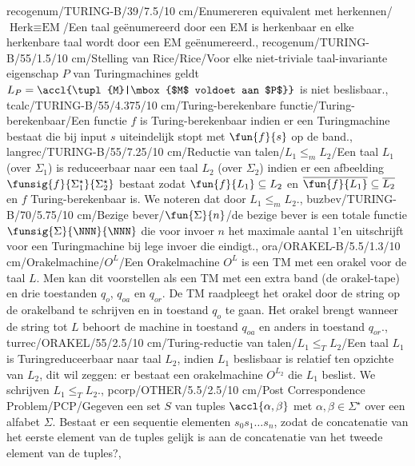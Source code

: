 recogenum/TURING-B/39/7.5/10 cm/Enumereren equivalent met herkennen/$\mbox{Herk}\equiv\mbox{EM}$/{Een taal ge\"enumereerd door een EM is herkenbaar en elke herkenbare taal wordt door een EM ge\"enumereerd.},
recogenum/TURING-B/55/1.5/10 cm/Stelling van Rice/Rice/{Voor elke niet-triviale taal-invariante eigenschap $P$ van Turingmachines geldt $L_{P}=\accl{\tupl{M}|\mbox{$M$ voldoet aan $P$}}$ is niet beslisbaar.},
tcalc/TURING-B/55/4.375/10 cm/Turing-berekenbare functie/Turing-berekenbaar/{Een functie $f$ is Turing-berekenbaar indien er een Turingmachine bestaat die bij input $s$ uiteindelijk stopt met $\fun{f}{s}$ op de band.},
langrec/TURING-B/55/7.25/10 cm/Reductie van talen/$L_1\leq_mL_2$/{Een taal $L_1$ (over $\Sigma_1$) is reduceerbaar naar een taal $L_2$ (over $\Sigma_2$) indien er een afbeelding $\funsig{f}{\Sigma_1^{\star}}{\Sigma_2^{\star}}$ bestaat zodat $\fun{f}{L_1}\subseteq L_2$ en $\overline{\fun{f}{L_1}}\subseteq\overline{L_2}$ en $f$ Turing-berekenbaar is. We noteren dat door $L_1\leq_mL_2$.},
buzbev/TURING-B/70/5.75/10 cm/Bezige bever/$\fun{\Sigma}{n}$/{de bezige bever is een totale functie $\funsig{\Sigma}{\NNN}{\NNN}$ die voor invoer $n$ het maximale aantal $1$'en uitschrijft voor een Turingmachine bij lege invoer die eindigt.},
ora/ORAKEL-B/5.5/1.3/10 cm/Orakelmachine/$O^L$/{Een Orakelmachine $O^L$ is een TM met een orakel voor de taal $L$. Men kan dit voorstellen als een TM met een extra band (de orakel-tape) en drie toestanden $q_o$, $q_{oa}$ en $q_{or}$. De TM raadpleegt het orakel door de string op de orakelband te schrijven en in toestand $q_o$ te gaan. Het orakel brengt wanneer de string tot $L$ behoort de machine in toestand $q_{oa}$ en anders in toestand $q_{or}$.},
turrec/ORAKEL/55/2.5/10 cm/Turing-reductie van talen/$L_1\leq_TL_2$/{Een taal $L_1$ is Turingreduceerbaar naar taal $L_2$, indien $L_1$ beslisbaar is relatief ten opzichte van $L_2$, dit wil zeggen: er bestaat een orakelmachine $O^{L_2}$ die $L_1$ beslist. We schrijven $L_1\leq_TL_2$.},
pcorp/OTHER/5.5/2.5/10 cm/Post Correspondence Problem/PCP/{Gegeven een set $S$ van tuples $\accl{\alpha,\beta}$ met $\alpha,\beta\in\Sigma^{\star}$ over een alfabet $\Sigma$. Bestaat er een sequentie elementen $s_0s_1\ldots s_n$, zodat de concatenatie van het eerste element van de tuples gelijk is aan de concatenatie van het tweede element van de tuples?},
